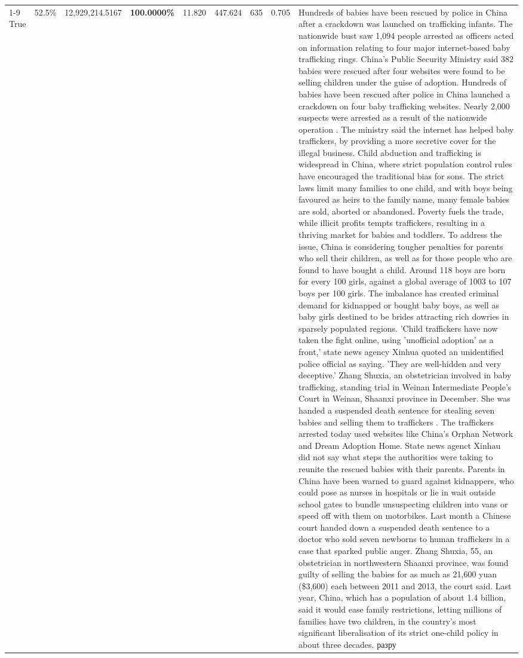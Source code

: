 \begin{table}[H]
\begin{tabular}{lllrlllll}
\cline{1-9}
True & 52.5\% & 12,929,214.5167 & \bfseries \color{red} 100.0000\% & 11.820 & 447.624 & 635 & 0.705 & Hundreds of babies have been rescued by police in China after a crackdown was launched on trafficking infants. The nationwide bust saw 1,094 people arrested as officers acted on information relating to four major internet-based baby trafficking rings. China's Public Security Ministry said 382 babies were rescued after four websites were found to be selling children under the guise of adoption. Hundreds of babies have been rescued after police in China launched a crackdown on four baby trafficking websites. Nearly 2,000 suspects were arrested as a result of the nationwide operation . The ministry said the internet has helped baby traffickers, by providing a more secretive cover for the illegal business. Child abduction and trafficking is widespread in China, where strict population control rules have encouraged the traditional bias for sons. The strict laws limit many families to one child, and with boys being favoured as heirs to the family name, many female babies are sold, aborted or abandoned. Poverty fuels the trade, while illicit profits tempts traffickers, resulting in a thriving market for babies and toddlers. To address the issue, China is considering tougher penalties for parents who sell their children, as well as for those people who are found to have bought a child. Around 118 boys are born for every 100 girls, against a global average of 1003 to 107 boys per 100 girls. The imbalance has created criminal demand for kidnapped or bought baby boys, as well as baby girls destined to be brides attracting rich dowries in sparsely populated regions. 'Child traffickers have now taken the fight online, using 'unofficial adoption' as a front,' state news agency Xinhua quoted an unidentified police official as saying. 'They are well-hidden and very deceptive.' Zhang Shuxia, an obstetrician involved in baby trafficking, standing trial in Weinan Intermediate People's Court in Weinan, Shaanxi province in December. She was handed a suspended death sentence for stealing seven babies and selling them to traffickers . The traffickers arrested today used websites like China's Orphan Network and Dream Adoption Home. State news agenct Xinhau did not say what steps the authorities were taking to reunite the rescued babies with their parents. Parents in China have been warned to guard against kidnappers, who could pose as nurses in hospitals or lie in wait outside school gates to bundle unsuspecting children into vans or speed off with them on motorbikes. Last month a Chinese court handed down a suspended death sentence to a doctor who sold seven newborns to human traffickers in a case that sparked public anger. Zhang Shuxia, 55, an obstetrician in northwestern Shaanxi province, was found guilty of selling the babies for as much as 21,600 yuan (\$3,600) each between 2011 and 2013, the court said. Last year, China, which has a population of about 1.4 billion, said it would ease family restrictions, letting millions of families have two children, in the country's most significant liberalisation of its strict one-child policy in about three decades. разру \\

\end{tabular}
\end{table}
